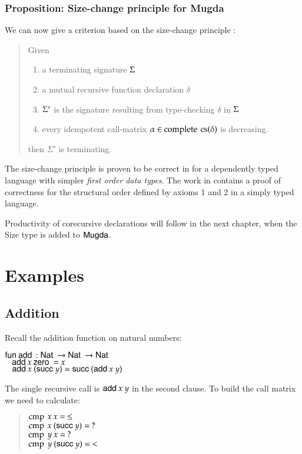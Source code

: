 \subsubsection{Proposition: Size-change principle for Mugda}
We can now give a criterion based on the size-change principle \cite{lee01sizechange}:
\begin{quote}
Given
\begin{enumerate}
\item
a terminating signature $\Sigma$
\item
a mutual recursive function declaration $\delta$
\item
$\Sigma'$ is the signature resulting from type-checking $\delta$ in $\Sigma$
\item
every idempotent call-matrix  $ \alpha \in \operatorname{complete} \: \operatorname{cs}(\delta)$ is decreasing.
\end{enumerate}
then $\Sigma'$ is terminating.
\end{quote}
\noindent The size-change principle is proven to be correct in \cite{wahlstedt:phd:2007} for a dependently typed language 
with simpler \emph{first order data types}.
The work in \cite{abelAltenkirch:predStRec} contains a proof of correctness for the structural order defined by axioms 1 and 2 in a simply typed language. 

Productivity of corecursive declarations will follow in the next chapter, when the Size type is added to $\textsf{Mugda}$.

\section{Examples}

\subsection{Addition}

Recall the addition function on natural numbers:

\begin{bsp}
$\mathsf{fun}\: \mathsf{add}\: : \mathsf{Nat}\: \rightarrow \mathsf{Nat}\: \rightarrow \mathsf{Nat}\:$\\
$\hspace*{3mm} \mathsf{add}\: x \: \mathsf{zero}\: = x $\\
$\hspace*{3mm} \mathsf{add}\: x \: (\mathsf{succ}\: y) = \mathsf{succ}\: (\mathsf{add}\: x \: y)  $
\end{bsp}
The single recursive call is $\mathsf{add}\: x \: y$ in the second clause.
To build the call matrix we need to calculate:
\begin{quote}
$\operatorname{cmp} \: x \: x = \: \leq $\\
$\operatorname{cmp} \: x \: (\mathsf{succ}\: y) = \: ? $\\
$\operatorname{cmp} \: y \: x = \: ? $\\
$\operatorname{cmp} \: y \: (\mathsf{succ}\: y) = \: < $ 
\end{quote}

